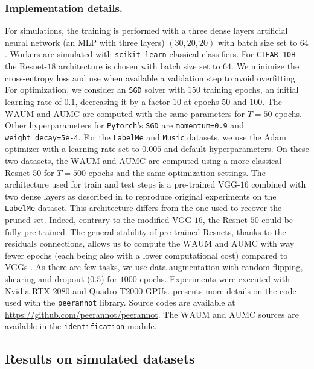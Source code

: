 \subsubsection*{Implementation details.}
For simulations, the training is performed with a three dense layers artificial neural network (an MLP with three layers) $(30, 20, 20)$ with batch size set to $64$.
Workers are simulated with \texttt{scikit-learn} \citep{scikit-learn} classical classifiers.
For \texttt{CIFAR-10H} the Resnet-$18$ \citep{he2016deep} architecture is chosen with batch size set to $64$.
We minimize the cross-entropy loss and use when available a validation step to avoid overfitting.
For optimization, we consider an \texttt{SGD} solver with $150$ training epochs, an initial learning rate of $0.1$, decreasing it by a factor $10$ at epochs $50$ and $100$.
The $\mathrm{WAUM}$ and $\mathrm{AUMC}$ are computed with the same parameters for $T=50$ epochs.
Other hyperparameters for \texttt{Pytorch}'s \citep{pytorch} \texttt{SGD} are \texttt{momentum=0.9} and \texttt{weight\_decay=5e-4}.
For the \texttt{LabelMe} and \texttt{Music} datasets, we use the Adam optimizer with a learning rate set to $0.005$ and default hyperparameters.
On these two datasets, the $\mathrm{WAUM}$ and $\mathrm{AUMC}$ are computed using a more classical Resnet-50 for $T=500$ epochs and the same optimization settings.
The architecture used for train and test steps is a pre-trained VGG-$16$ combined with two dense layers as described in \citet{rodrigues2018deep} to reproduce original experiments on the \texttt{LabelMe} dataset.
This architecture differs from the one used to recover the pruned set.
Indeed, contrary to the modified VGG-$16$, the Resnet-$50$ could be fully pre-trained.
The general stability of pre-trained Resnets, thanks to the residuals connections, allows us to compute the $\mathrm{WAUM}$ and $\mathrm{AUMC}$ with way fewer epochs (each being also with a lower computational cost) compared to VGGs \citep{he2016deep}.
As there are few tasks, we use data augmentation with random flipping, shearing and dropout ($0.5$) for $1000$ epochs.
Experiments were executed with Nvidia RTX 2080 and Quadro T2000 GPUs.
 presents more details on the code used with the \texttt{peerannot} library.
Source codes are available at \url{https://github.com/peerannot/peerannot}. The $\mathrm{WAUM}$ and $\mathrm{AUMC}$ sources are available in the \texttt{identification} module.

\subsection{Results on simulated datasets}
\label{subsec:Synthetic_dataset}

